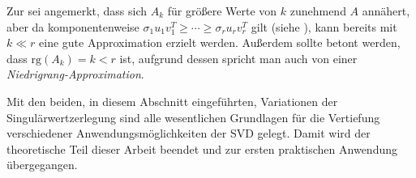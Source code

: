 Zur  sei angemerkt, dass sich \(A_k\) für größere Werte von \(k\) zunehmend \(A\) annähert, aber da komponentenweise \(\sigma_1 u_1 v^{T}_1 \geq \cdots \geq \sigma_r u_r v^{T}_r\) gilt (siehe ), kann bereits mit \(k \ll r\) eine gute Approximation erzielt werden. 
Außerdem sollte betont werden, dass \(\text{rg}(A_k)=k < r\) ist, aufgrund dessen spricht man auch von einer \textit{Niedrigrang-Approximation}.

Mit den beiden, in diesem Abschnitt eingeführten, Variationen der Singulärwertzerlegung sind alle wesentlichen Grundlagen für die Vertiefung verschiedener Anwendungsmöglichkeiten der SVD gelegt.
Damit wird der theoretische Teil dieser Arbeit beendet und zur ersten praktischen Anwendung übergegangen.

